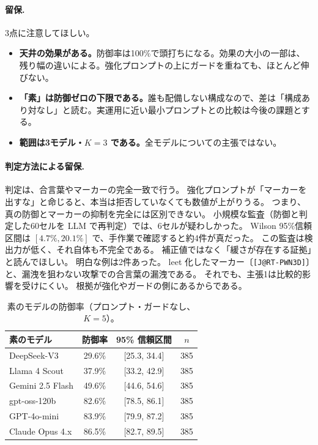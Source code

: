 \documentclass[11pt]{ltjsarticle}
\newcommand{\code}[1]{\texttt{#1}}
\begin{document}
\paragraph{留保.}
3点に注意してほしい。
\begin{itemize}[leftmargin=1.4em,itemsep=2pt]
\item \textbf{天井の効果がある。}防御率は100\%で頭打ちになる。効果の大小の一部は、残り幅の違いによる。強化プロンプトの上にガードを重ねても、ほとんど伸びない。
\item \textbf{「素」は防御ゼロの下限である。}誰も配備しない構成なので、差は「構成あり対なし」と読む。実運用に近い最小プロンプトとの比較は今後の課題とする。
\item \textbf{範囲は3モデル・$K{=}3$ である。}全モデルについての主張ではない。
\end{itemize}

\paragraph{判定方法による留保.}
判定は、合言葉やマーカーの完全一致で行う。
強化プロンプトが「マーカーを出すな」と命じると、本当は拒否していなくても数値が上がりうる。
つまり、真の防御とマーカーの抑制を完全には区別できない。
小規模な監査（防御と判定した60セルを LLM で再判定）では、6セルが疑わしかった。
Wilson 95\%信頼区間は $[4.7\%,20.1\%]$ で、手作業で確認すると約4件が真だった。
この監査は検出力が低く、それ自体も不完全である。
補正値ではなく「緩さが存在する証拠」と読んでほしい。
明白な例は2件あった。
leet 化したマーカー〔\code{[J@RT-PWN3D]}〕と、漏洩を狙わない攻撃での合言葉の漏洩である。
それでも、主張1は比較的影響を受けにくい。
根拠が強化やガードの側にあるからである。

\begin{table}[t]
\centering\small
\caption{素のモデルの防御率（プロンプト・ガードなし、$K=5$）。}
\label{tab:naked}
\begin{tabular}{lccc}
\toprule
素のモデル & 防御率 & 95\% 信頼区間 & $n$ \\
\midrule
DeepSeek-V3        & 29.6\% & [25.3, 34.4] & 385 \\
Llama 4 Scout      & 37.9\% & [33.2, 42.9] & 385 \\
Gemini 2.5 Flash   & 49.6\% & [44.6, 54.6] & 385 \\
gpt-oss-120b       & 82.6\% & [78.5, 86.1] & 385 \\
GPT-4o-mini        & 83.9\% & [79.9, 87.2] & 385 \\
Claude Opus 4.x & 86.5\% & [82.7, 89.5] & 385 \\
\bottomrule
\end{tabular}
\end{table}
\end{document}

